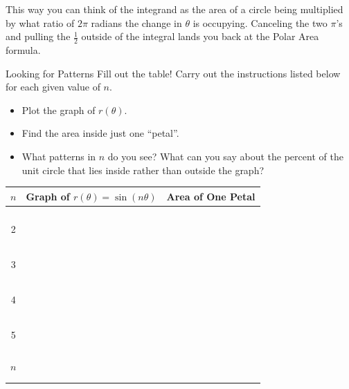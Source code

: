 This way you can think of the integrand as the area of a circle being multiplied by what ratio of $2\pi$ radians the change in $\theta$ is occupying.  Canceling the two $\pi$'s and pulling the $\frac{1}{2}$ outside of the integral lands you back at the Polar Area formula.

\begin{exercise}{Looking for Patterns \Coffeecup \Coffeecup \Coffeecup}
Fill out the table! Carry out the instructions listed below for each given value of $n$. 
\begin{itemize}

\item Plot the graph of $r(\theta). $
\item Find the area inside just one ``petal''.
\item What patterns in $n$ do you see?  What can you say about the percent of the unit circle that lies inside rather than outside the graph?
\end{itemize}\begin{center}
\begin{tabular}{|c|c|c|} \hline
$n$ & \hspace{1in} Graph of $r(\theta)=\sin(n\theta)$ \hspace{1in} & Area of One Petal \\ \hline
& & \\
& & \\
& & \\
& & \\
2 &  & \\ 
  & & \\
  & & \\
  & & \\
  & & \\
  & & \\
3 &  & \\ 
& & \\
& & \\
& & \\
& & \\
& & \\
4 & & \\  
& & \\
& & \\
& & \\
& & \\
& & \\
5 &  & \\  
& & \\
& & \\
& & \\
& & \\ 
$n$ &  & \\  
& & \\ 
& & \\ 
\hline 
\end{tabular}


\end{center}
\end{exercise}
